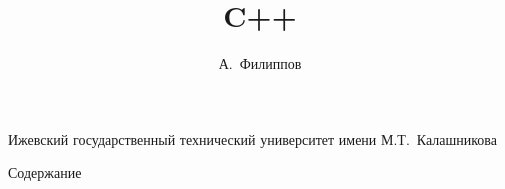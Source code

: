 \title[C++]{C++}
\author[Филиппов]{А.~Филиппов}
\institute
{
    Ижевский государственный технический университет имени М.Т.~Калашникова
}
\frame{\titlepage}
\begin{frame}{Содержание}
    \tableofcontents
\end{frame}
